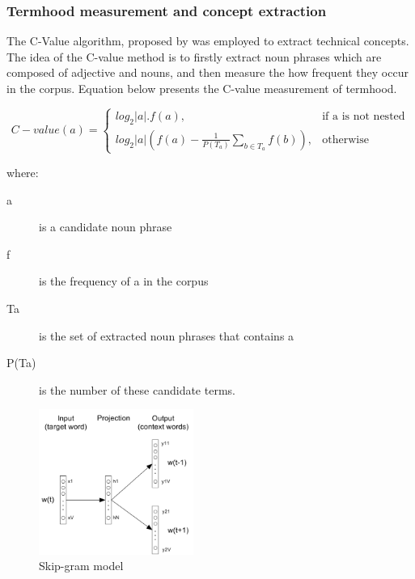 \documentclass[Journal, InsideFigs, DoubleSpace]{ascelike} %
\begin{document}
\subsubsection{Termhood measurement and concept extraction}
The C-Value algorithm, proposed by \cite{Frantzi20} was employed to extract technical concepts. The idea of the C-value method is to firstly extract noun phrases which are composed of adjective and nouns, and then measure the how frequent they occur in the corpus. Equation below presents the C-value measurement of termhood.

\begin{equation}
    C-value(a)=
    \begin{cases}
      log_2|a|.f(a), & \text{if a is not nested} \\
      log_2|a|(f(a)-\frac{1}{P(T_a)}\sum_{b\in T_a} f(b)), & \text{otherwise}
    \end{cases}
  \end{equation}
  
where:
\begin{description}
\item[a] is a candidate noun phrase
\item[f] is the frequency of a in the corpus
\item[Ta] is the set of extracted noun phrases that contains a
\item[P(Ta)] is the number of these candidate terms.
\end{description}

\begin{figure}[t]
\centering
\includegraphics[width=0.45\textwidth]{skip-gram-model}
\caption{Skip-gram model}
\label{fig:skip-gram}
\end{figure}
\end{document}
